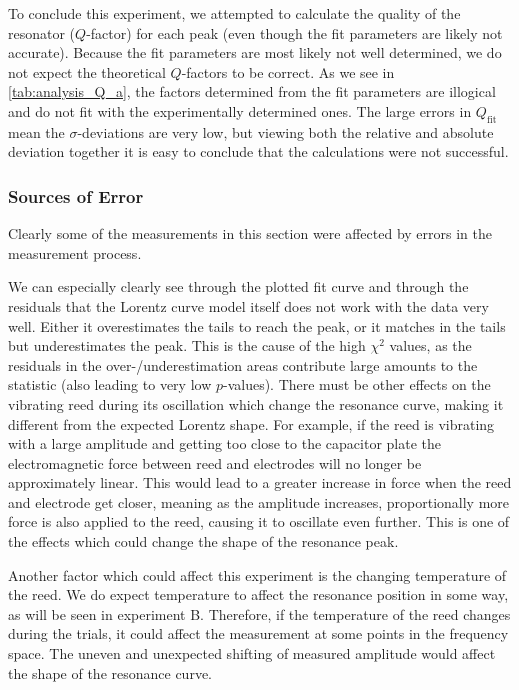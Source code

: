 To conclude this experiment, we attempted to calculate the quality of the resonator ($Q$-factor) for each peak (even though the fit parameters are likely not accurate).
Because the fit parameters are most likely not well determined, we do not expect the theoretical $Q$-factors to be correct.
As we see in \autoref{tab:analysis_Q_a}, the factors determined from the fit parameters are illogical and do not fit with the experimentally determined ones.
The large errors in $Q_\mathrm{fit}$ mean the $\sigma$-deviations are very low, but viewing both the relative and absolute deviation together it is easy to conclude that the calculations were not successful.

\subsubsection{Sources of Error}

Clearly some of the measurements in this section were affected by errors in the measurement process.

We can especially clearly see through the plotted fit curve and through the residuals that the Lorentz curve model itself does not work with the data very well. Either it overestimates the tails to reach the peak, or it matches in the tails but underestimates the peak.
This is the cause of the high $\chi^2$ values, as the residuals in the over-/underestimation areas contribute large amounts to the statistic (also leading to very low $p$-values).
There must be other effects on the vibrating reed during its oscillation which change the resonance curve, making it different from the expected Lorentz shape.
For example, if the reed is vibrating with a large amplitude and getting too close to the capacitor plate the electromagnetic force between reed and electrodes will no longer be approximately linear.
This would lead to a greater increase in force when the reed and electrode get closer, meaning as the amplitude increases, proportionally more force is also applied to the reed, causing it to oscillate even further.
This is one of the effects which could change the shape of the resonance peak.

Another factor which could affect this experiment is the changing temperature of the reed.
We do expect temperature to affect the resonance position in some way, as will be seen in experiment B.
Therefore, if the temperature of the reed changes during the trials, it could affect the measurement at some points in the frequency space.
The uneven and unexpected shifting of measured amplitude would affect the shape of the resonance curve.

